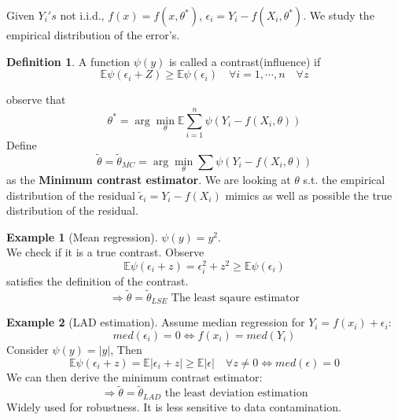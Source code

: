 \documentclass[a4paper,12pt, oneside, fleqn]{book}
\theoremstyle{definition}
\newtheorem{definition}{Definition}[section]
\newtheorem*{example}{Example}
\theoremstyle{remark}
\begin{document}
Given $Y_i's$ not i.i.d., $f(x) = f(x, \theta^*)$, $\epsilon_i = Y_i - f(X_i, \theta^*)$. We study the empirical distribution of the error's. 
\begin{definition}
	A function $\psi(y)$ is called a contrast(influence) if 
	\begin{equation*}
		\mathbb{E} \psi(\epsilon_i + Z) \geq \mathbb{E} \psi(\epsilon_i) \quad \forall i = 1, \cdots, n \quad \forall z
	\end{equation*}
\end{definition}
observe that 
	\begin{equation*}
		\theta^* = \arg \min_\theta \mathbb{E} \sum_{i = 1}^{n} \psi(Y_i - f(X_i, \theta))
	\end{equation*}
Define
\begin{equation*}
		\tilde{\theta} = \tilde{\theta}_{MC} = \arg \min_\theta \sum \psi(Y_i - f(X_i, \theta))
\end{equation*}
as the \textbf{Minimum contrast estimator}. We are looking at $\theta$ s.t. the empirical distribution of the residual $\tilde{\epsilon}_i = Y_i - f(X_i)$ mimics as well as possible the true distribution of the residual.


\begin{example}[Mean regression]
$\psi(y) = y^2$. \\We check if it is a true contrast. Observe
\begin{equation*}
	\mathbb{E} \psi(\epsilon_i + z) = \mathbb \epsilon_i^2 + z^2 \geq \mathbb{E} \psi(\epsilon_i)
\end{equation*}
satisfies the definition of the contrast.
\begin{equation*}
	\Rightarrow \tilde{\theta} = \tilde{\theta}_{LSE} \text{ The least sqaure estimator}
\end{equation*}
\end{example}


\begin{example}[LAD estimation]
 Assume median regression for $Y_i = f(x_i) + \epsilon_i$:
 \begin{equation*}
 	med(\epsilon_i) = 0 \Leftrightarrow f(x_i) = med(Y_i)
 \end{equation*}
	Consider $\psi(y) = |y|$, Then
	\begin{equation*}
		\mathbb{E}\psi(\epsilon_i + z) = \mathbb{E} |\epsilon_i + z| \geq \mathbb{E} |\epsilon| \quad \forall z \neq 0 \Leftrightarrow med(\epsilon) = 0
	\end{equation*}
	We can then derive the minimum contrast estimator:
	\begin{equation*}
		\Rightarrow \tilde{\theta} = \tilde{\theta}_{LAD} \text{ the least deviation estimation}
	\end{equation*}
	Widely used for robustness. It is less sensitive to data contamination.
\end{example}
\end{document}

